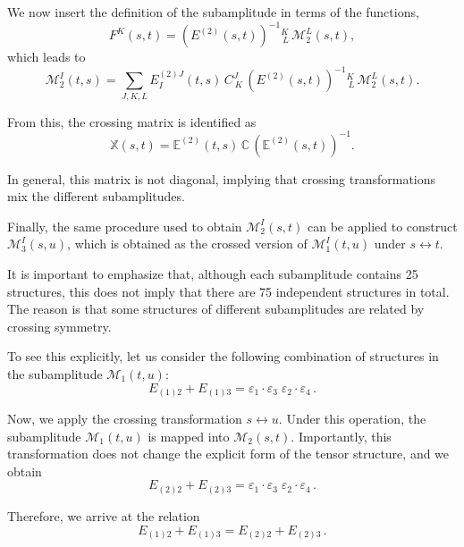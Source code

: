 We now insert the definition of the subamplitude in terms of the functions,
\begin{equation}
    F^K(s,t) = \left(E^{(2)}(s,t)\right)^{-1}{}^{K}_{\ L}\, \mathcal{M}_2^L(s,t),
\end{equation}
which leads to
\begin{equation}
    \mathcal{M}_2^I(t, s) = \sum_{J,K,L} E_{I}^{(2) J}(t, s)\, C^J_{\ K}\, \left(E^{(2)}(s,t)\right)^{-1}{}^{K}_{\ L}\, \mathcal{M}_2^L(s, t).
\end{equation}

From this, the crossing matrix is identified as
\begin{equation}
    \mathbb{X}(s,t) = \mathbb{E}^{(2)}(t, s)\, \mathbb{C}\, \left(\mathbb{E}^{(2)}(s, t)\right)^{-1}.
\end{equation}

In general, this matrix is not diagonal, implying that crossing transformations mix the different subamplitudes.

Finally, the same procedure used to obtain \(\mathcal{M}_2^I(s, t)\) can be applied to construct \(\mathcal{M}_3^I(s, u)\), which is obtained as the crossed version of \(\mathcal{M}_1^I(t, u)\) under \( s \leftrightarrow t \).

It is important to emphasize that, although each subamplitude contains 25 structures, this does not imply that there are 75 independent structures in total. The reason is that some structures of different subamplitudes are related by crossing symmetry.

To see this explicitly, let us consider the following combination of structures in the subamplitude $\mathcal{M}_1(t,u)$:
\begin{equation}
E_{(1)2} + E_{(1)3} = \varepsilon_1 \cdot \varepsilon_3 \; \varepsilon_2 \cdot \varepsilon_4 \, .
\end{equation}

Now, we apply the crossing transformation $s \leftrightarrow u$. Under this operation, the subamplitude $\mathcal{M}_1(t,u)$ is mapped into $\mathcal{M}_2(s,t)$. Importantly, this transformation does not change the explicit form of the tensor structure, and we obtain
\begin{equation}
E_{(2)2} + E_{(2)3} = \varepsilon_1 \cdot \varepsilon_3 \; \varepsilon_2 \cdot \varepsilon_4 \, .
\end{equation}

Therefore, we arrive at the relation
\begin{equation}
E_{(1)2} + E_{(1)3} = E_{(2)2} + E_{(2)3} \, .
\end{equation}

